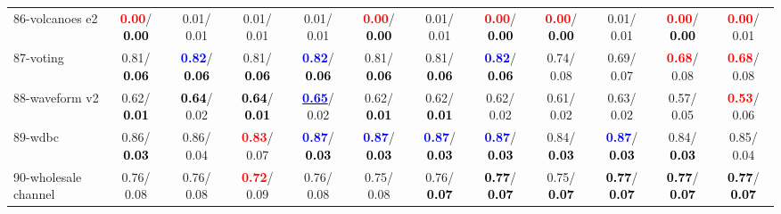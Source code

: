 \begin{table}[h]
\begin{center}
{\begin{tabular}{lc|c|c|c|c|c|c|c|c|c|c}
86-volcanoes e2 & \textcolor{red}{\textbf{  0.00}}/\textcolor{black}{\textbf{  0.00}} &   0.01/  0.01 &   0.01/  0.01 &   0.01/  0.01 & \textcolor{red}{\textbf{  0.00}}/\textcolor{black}{\textbf{  0.00}} &   0.01/  0.01 & \textcolor{red}{\textbf{  0.00}}/\textcolor{black}{\textbf{  0.00}} & \textcolor{red}{\textbf{  0.00}}/\textcolor{black}{\textbf{  0.00}} &   0.01/  0.01 & \textcolor{red}{\textbf{  0.00}}/\textcolor{black}{\textbf{  0.00}} & \textcolor{red}{\textbf{  0.00}}/  0.01 \\
87-voting &   0.81/\textcolor{black}{\textbf{  0.06}} & \textcolor{blue}{\textbf{  0.82}}/\textcolor{black}{\textbf{  0.06}} &   0.81/\textcolor{black}{\textbf{  0.06}} & \textcolor{blue}{\textbf{  0.82}}/\textcolor{black}{\textbf{  0.06}} &   0.81/\textcolor{black}{\textbf{  0.06}} &   0.81/\textcolor{black}{\textbf{  0.06}} & \textcolor{blue}{\textbf{  0.82}}/\textcolor{black}{\textbf{  0.06}} &   0.74/  0.08 &   0.69/  0.07 & \textcolor{red}{\textbf{  0.68}}/  0.08 & \textcolor{red}{\textbf{  0.68}}/  0.08 \\
88-waveform v2 &   0.62/\textcolor{black}{\textbf{  0.01}} & \textcolor{black}{\textbf{  0.64}}/  0.02 & \textcolor{black}{\textbf{  0.64}}/\textcolor{black}{\textbf{  0.01}} & \underline{\textcolor{blue}{\textbf{  0.65}}}/  0.02 &   0.62/\textcolor{black}{\textbf{  0.01}} &   0.62/\textcolor{black}{\textbf{  0.01}} &   0.62/  0.02 &   0.61/  0.02 &   0.63/  0.02 &   0.57/  0.05 & \textcolor{red}{\textbf{  0.53}}/  0.06 \\
89-wdbc &   0.86/\textcolor{black}{\textbf{  0.03}} &   0.86/  0.04 & \textcolor{red}{\textbf{  0.83}}/  0.07 & \textcolor{blue}{\textbf{  0.87}}/\textcolor{black}{\textbf{  0.03}} & \textcolor{blue}{\textbf{  0.87}}/\textcolor{black}{\textbf{  0.03}} & \textcolor{blue}{\textbf{  0.87}}/\textcolor{black}{\textbf{  0.03}} & \textcolor{blue}{\textbf{  0.87}}/\textcolor{black}{\textbf{  0.03}} &   0.84/\textcolor{black}{\textbf{  0.03}} & \textcolor{blue}{\textbf{  0.87}}/\textcolor{black}{\textbf{  0.03}} &   0.84/\textcolor{black}{\textbf{  0.03}} &   0.85/  0.04 \\
90-wholesale channel &   0.76/  0.08 &   0.76/  0.08 & \textcolor{red}{\textbf{  0.72}}/  0.09 &   0.76/  0.08 &   0.75/  0.08 &   0.76/\textcolor{black}{\textbf{  0.07}} & \textcolor{black}{\textbf{  0.77}}/\textcolor{black}{\textbf{  0.07}} &   0.75/\textcolor{black}{\textbf{  0.07}} & \textcolor{black}{\textbf{  0.77}}/\textcolor{black}{\textbf{  0.07}} & \textcolor{black}{\textbf{  0.77}}/\textcolor{black}{\textbf{  0.07}} & \textcolor{black}{\textbf{  0.77}}/\textcolor{black}{\textbf{  0.07}} \\

\end{tabular}}
\end{center}
\end{table}
